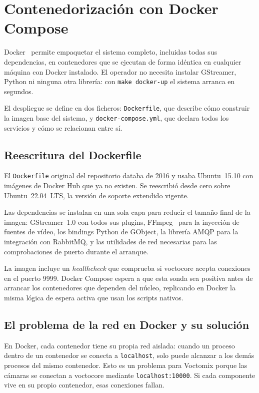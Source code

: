 \section{Contenedorización con Docker Compose}
\label{sec:docker}

Docker~\cite{merkel2014docker,docker_compose_docs} permite empaquetar el sistema completo, incluidas todas sus dependencias, en
contenedores que se ejecutan de forma idéntica en cualquier máquina con Docker instalado.
El operador no necesita instalar GStreamer, Python ni ninguna otra librería: con
\texttt{make docker-up} el sistema arranca en segundos.

El despliegue se define en dos ficheros: \texttt{Dockerfile}, que describe cómo construir
la imagen base del sistema, y \texttt{docker-compose.yml}, que declara todos los servicios
y cómo se relacionan entre sí.

\subsection{Reescritura del Dockerfile}

El \texttt{Dockerfile} original del repositorio databa de 2016 y usaba Ubuntu~15.10 con
imágenes de Docker Hub que ya no existen. Se reescribió desde cero sobre
Ubuntu~22.04~LTS, la versión de soporte extendido vigente.

Las dependencias se instalan en una sola capa para reducir el tamaño final de la imagen:
GStreamer~1.0 con todos sus plugins, FFmpeg~\cite{ffmpeg_project} para la inyección de fuentes de vídeo, los
bindings Python de GObject, la librería AMQP para la integración con RabbitMQ, y las
utilidades de red necesarias para las comprobaciones de puerto durante el arranque.

La imagen incluye un \textit{healthcheck} que comprueba si voctocore acepta conexiones
en el puerto 9999. Docker Compose espera a que esta sonda sea positiva antes de arrancar
los contenedores que dependen del núcleo, replicando en Docker la misma lógica de espera
activa que usan los scripts nativos.

\subsection{El problema de la red en Docker y su solución}
\label{sec:docker_red}

En Docker, cada contenedor tiene su propia red aislada: cuando un proceso dentro de
un contenedor se conecta a \texttt{localhost}, solo puede alcanzar a los demás procesos
del mismo contenedor. Esto es un problema para Voctomix porque las cámaras se conectan
a voctocore mediante \texttt{localhost:10000}. Si cada componente vive en su propio
contenedor, esas conexiones fallan.

